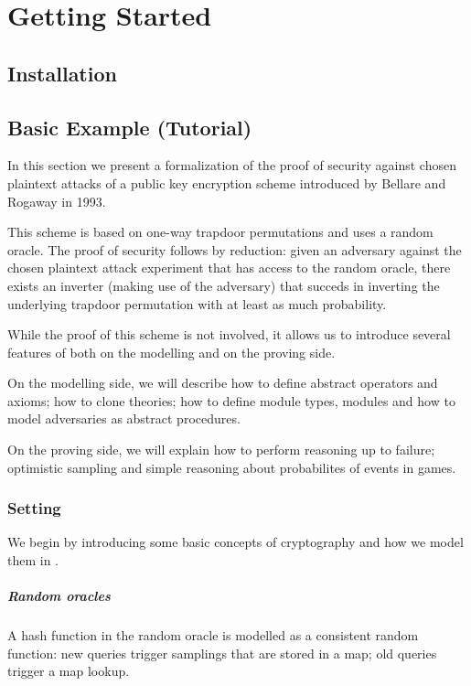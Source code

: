 
\chapter{Getting Started}
\section{Installation}

\section{Basic Example (Tutorial)}
In this section we present a formalization of the proof of security
against chosen plaintext attacks of a public key encryption scheme
introduced by Bellare and Rogaway in 1993.

This scheme is based on one-way trapdoor permutations and uses a
random oracle. The proof of security follows by reduction: given an
adversary against the chosen plaintext attack experiment that has
access to the random oracle, there exists an inverter (making use of
the adversary) that succeds in inverting the underlying trapdoor
permutation with at least as much probability.

While the proof of this scheme is not involved, it allows us to
introduce several features of \EC both on the modelling and on
the proving side.

On the modelling side, we will describe how to define abstract operators
and axioms; how to clone theories; how to define module types, modules
and how to model adversaries as abstract procedures.

On the proving side, we will explain how to perform reasoning up to
failure; optimistic sampling and simple reasoning about probabilites
of events in games.

\subsection{Setting}
We begin by introducing some basic concepts of cryptography and how we
model them in \EC.

\paragraph{Random oracles}
A hash function in the random oracle is modelled as a consistent
random function: new queries trigger samplings that are stored in a
map; old queries trigger a map lookup.

